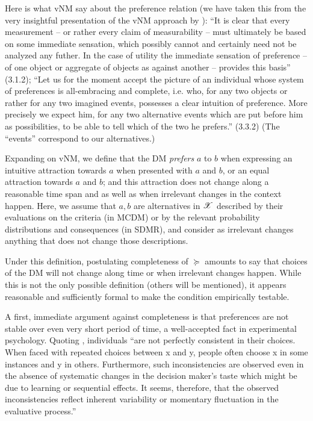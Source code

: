 \documentclass[french, english]{llncs}
\begin{document}
Here is what vNM say about the preference relation (we have taken this from the very insightful presentation of the vNM approach by \citet{fishburn_retrospective_1989}):
“It is clear that every measurement – or rather every claim of measurability – must ultimately be based on some immediate sensation, 
which possibly cannot and certainly need not be analyzed any futher.
In the case of utility the immediate sensation of preference – of one object or aggregate of objects as against another – 
provides this basis” (3.1.2);
“Let us for the moment accept the picture of an individual whose system of preferences is all-embracing and complete, i.e. who, for any two objects or rather for any two imagined events, possesses a clear intuition of preference. More precisely
 we expect him, for any two alternative events which are put before him as possibilities, to be able to tell which of the two he prefers.” (3.3.2) (The “events” correspond to our alternatives.)
	
Expanding on vNM, we define that the \ac{DM} \emph{prefers} $a$ to $b$ when expressing an intuitive attraction towards $a$ when presented with $a$ and $b$, or an equal attraction towards $a$ and $b$; and this attraction does not change along a reasonable time span and as well as when irrelevant changes in the context happen. %
Here, we assume that $a, b$ are alternatives in $\mathscr{X}$ described by their evaluations on the criteria (in MCDM) or by the relevant probability distributions and consequences (in SDMR), and consider as irrelevant changes anything that does not change those descriptions. 

Under this definition, postulating completeness of $\succeq$ amounts to say that choices of the \ac{DM} will not change along time or when irrelevant changes happen. While this is not the only possible definition (others will be mentioned), it appears reasonable and sufficiently formal to make the condition empirically testable.
	
A first, immediate argument against completeness is that preferences are not stable over even very short period of time, a well-accepted fact in experimental psychology. Quoting \citet{tversky_intransitivity_1969}, individuals “are not perfectly consistent in their choices. When faced with repeated choices between x and y, 
people often choose x in some instances and y in others. Furthermore, such inconsistencies are observed even in the absence of systematic changes in the decision maker’s taste which might be due to learning or sequential effects. It seems, therefore, that the observed 
inconsistencies reflect inherent variability 
or momentary fluctuation 
in the evaluative process.” 
	
\end{document}
